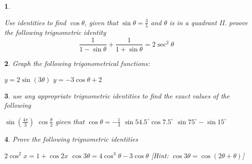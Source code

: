 \documentclass{article}
\newtheorem{question}{}
\begin{document}
\begin{question}
    \begin{tasks}
        \task Use identities to find $\cos{\theta}$, given that $\sin{\theta} = \frac{3}{5}$ and $\theta$ is in a quadrant II.
        \vspace{7 cm}
        \task proove the following trignometric identity
        \begin{equation}
            \frac{1}{1 - \sin{\theta}} + \frac{1}{1 + \sin{\theta}} = 2 \sec^2 \theta
        \end{equation}
        \vspace{7 cm}
    \end{tasks}
\end{question}

\begin{question}
    Graph the following trigonometrical functions:
    \begin{tasks}
        \task $y = 2 \sin{(3\theta)}$
        \vspace{7 cm}
        \task $y = -3\cos{\theta} + 2$
        \vspace{7 cm}
    \end{tasks}
\end{question}

\begin{question}
    use any appropriate trignometric identities to find the exact values of the following
    \begin{tasks}
        \task $\sin{(\frac{4\pi}{3})}$
        \vspace{7 cm}
        \task $\cos{\frac{\theta}{2}}$ given that $\cos\theta = -\frac{1}{3}$
        \vspace{7 cm}
        \task $\sin 54.5^{\circ} \cos 7.5^{\circ}$
        \vspace{7 cm}
        \task $\sin 75^{\circ} -  \sin 15^{\circ}$
        \vspace{7 cm}
    \end{tasks}
\end{question}

\begin{question}
    Prove the following trignometric identities
    \begin{tasks}
        \task $2 \cos^{2} x = 1 + \cos {2x}$
        \vspace{7 cm}
        \task $\cos{3\theta} = 4 \cos^3 \theta - 3 \cos\theta$  [Hint: $\cos{3\theta} = \cos{(2\theta + \theta)}$]
        \vspace{7 cm}
    \end{tasks}
\end{question}
\end{document}
